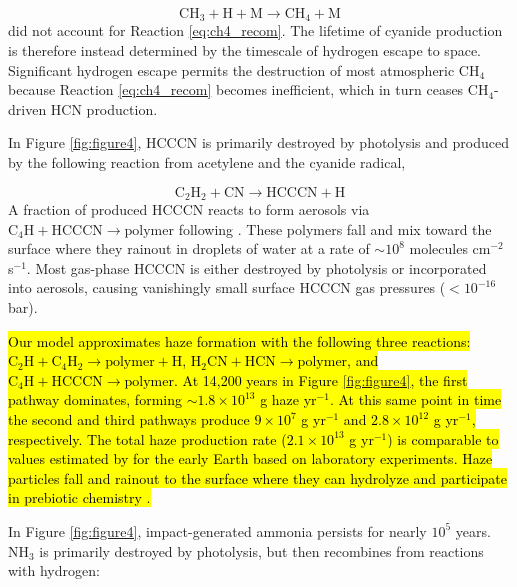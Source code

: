\begin{equation} \label{eq:ch4_recom}
  \mathrm{CH_3} + \mathrm{H} + \mathrm{M} \rightarrow \mathrm{CH_4} + \mathrm{M}  
\end{equation}
\citet{Zahnle_2020} did not account for Reaction \ref{eq:ch4_recom}. The lifetime of cyanide production is therefore instead determined by the timescale of hydrogen escape to space. Significant hydrogen escape permits the destruction of most atmospheric CH$_4$ because Reaction \ref{eq:ch4_recom} becomes inefficient, which in turn ceases CH$_4$-driven HCN production.

In Figure \ref{fig:figure4}, HCCCN is primarily destroyed by photolysis and produced by the following reaction from acetylene and the cyanide radical,

\begin{equation} \label{eq:hcccn}
  \mathrm{C_2H_2} + \mathrm{CN} \rightarrow \mathrm{HCCCN} + \mathrm{H}  
\end{equation}
A fraction of produced HCCCN reacts to form aerosols via $\mathrm{C_4H} + \mathrm{HCCCN} \rightarrow \mathrm{polymer}$ following \citet{Lavvas_2008}. These polymers fall and mix toward the surface where they rainout in droplets of water at a rate of $\sim 10^{8}$ molecules cm$^{-2}$ s$^{-1}$. Most gas-phase HCCCN is either destroyed by photolysis or incorporated into aerosols, causing vanishingly small surface HCCCN gas pressures ($< 10^{-{16}}$ bar).

\hl{Our model approximates haze formation with the following three reactions: $\mathrm{C_2H} + \mathrm{C_4H_2} \rightarrow \mathrm{polymer} + \mathrm{H}$, $\mathrm{H_2CN} + \mathrm{HCN} \rightarrow \mathrm{polymer}$, and $\mathrm{C_4H} + \mathrm{HCCCN} \rightarrow \mathrm{polymer}$. At 14,200 years in Figure \mbox{\ref{fig:figure4}}, the first pathway dominates, forming $\sim 1.8 \times 10^{13}$ g haze yr$^{-1}$. At this same point in time the second and third pathways produce $9 \times 10^{7}$ g yr$^{-1}$ and $2.8 \times 10^{12}$ g yr$^{-1}$, respectively. The total haze production rate ($2.1 \times 10^{13}$ g yr$^{-1}$) is comparable to values estimated by \mbox{\citet{Trainer_2006}} for the early Earth based on laboratory experiments. Haze particles fall and rainout to the surface where they can hydrolyze and participate in prebiotic chemistry \mbox{\citep{Neish_2010,Poch_2012}}.}

In Figure \ref{fig:figure4}, impact-generated ammonia persists for nearly $10^5$ years. NH$_3$ is primarily destroyed by photolysis, but then recombines from reactions with hydrogen:

